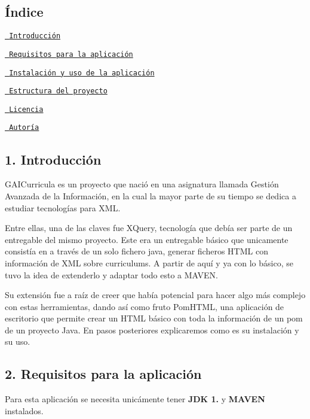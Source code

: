 \subsection*{Índice}


\begin{DoxyEnumerate}
\item \href{\#1-introducción}{\texttt{ Introducción}}
\item \href{\#2-requisitos-para-la-aplicación}{\texttt{ Requisitos para la aplicación}}
\item \href{\#3-instalación-y-uso-de-la-aplicación}{\texttt{ Instalación y uso de la aplicación}}
\item \href{\#4-estructura-del-proyecto}{\texttt{ Estructura del proyecto}}
\item \href{\#5-licencia}{\texttt{ Licencia}}
\item \href{\#6-autoría}{\texttt{ Autoría}}
\end{DoxyEnumerate}

\subsection*{1. Introducción}

G\+A\+I\+Curricula es un proyecto que nació en una asignatura llamada Gestión Avanzada de la Información, en la cual la mayor parte de su tiempo se dedica a estudiar tecnologías para X\+ML.

Entre ellas, una de las claves fue X\+Query, tecnología que debía ser parte de un entregable del mismo proyecto. Este era un entregable básico que unicamente consistía en a través de un solo fichero java, generar ficheros H\+T\+ML con información de X\+ML sobre curriculums. A partir de aquí y ya con lo básico, se tuvo la idea de extenderlo y adaptar todo esto a M\+A\+V\+EN.

Su extensión fue a raíz de creer que había potencial para hacer algo más complejo con estas herramientas, dando así como fruto Pom\+H\+T\+ML, una aplicación de escritorio que permite crear un H\+T\+ML básico con toda la información de un pom de un proyecto Java. En pasos posteriores explicaremos como es su instalación y su uso.

\subsection*{2. Requisitos para la aplicación}

Para esta aplicación se necesita unicámente tener {\bfseries{J\+DK 1.}} y {\bfseries{M\+A\+V\+EN}} instalados.

